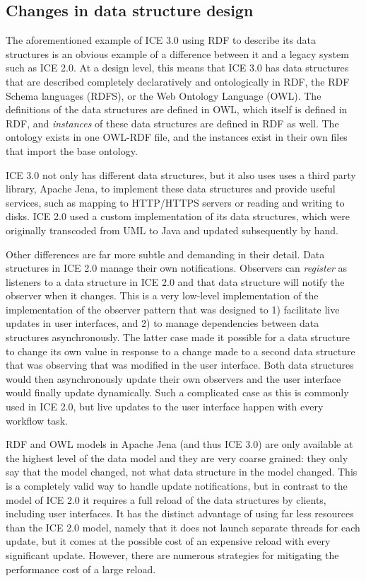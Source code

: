 \subsection{Changes in data structure design}

The aforementioned example of ICE 3.0 using RDF to describe its data structures
is an obvious example of a difference between it and a legacy system such as ICE
2.0. At a design level, this means that ICE 3.0 has data structures that are
described completely declaratively and ontologically in RDF, the RDF Schema
languages (RDFS), or the Web Ontology Language (OWL). The definitions of the
data structures are defined in OWL, which itself is defined in RDF, and
\textit{instances} of these data structures are defined in RDF as well. The
ontology exists in one OWL-RDF file, and the instances exist in their own files
that import the base ontology.

ICE 3.0 not only has different data structures, but it also uses uses a third
party library, Apache Jena, to implement these data structures and provide
useful services, such as mapping to HTTP/HTTPS servers or reading and writing
to disks. ICE 2.0 used a custom implementation of its data structures, which
were originally transcoded from UML to Java and updated subsequently by hand.

Other differences are far more subtle and demanding in their detail. Data
structures in ICE 2.0 manage their own notifications. Observers can
\textit{register} as listeners to a data structure in ICE 2.0 and that data
structure will notify the observer when it changes. This is a very low-level
implementation of the implementation of the observer pattern that was designed
to 1) facilitate live updates in user interfaces, and 2) to manage dependencies
between data structures asynchronously. The latter case made it possible for a
data structure to change its own value in response to a change made to a second
data structure that was observing that was modified in the user interface. Both
data structures would then asynchronously update their own observers and the
user interface would finally update dynamically. Such a complicated case as
this is commonly used in ICE 2.0, but live updates to the user interface happen
with every workflow task.

RDF and OWL models in Apache Jena (and thus ICE 3.0) are only available at the
highest level of the data model and they are very coarse grained: they only say
that the model changed, not what data structure in the model changed. This is a
completely valid way to handle update notifications, but in contrast to the
model of ICE 2.0 it requires a full reload of the data structures by clients,
including user interfaces. It has the distinct advantage of using far less
resources than the ICE 2.0 model, namely that it does not launch separate
threads for each update, but it comes at the possible cost of an expensive
reload with every significant update. However, there are numerous strategies
for mitigating the performance cost of a large reload.

